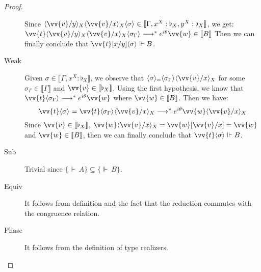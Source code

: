 \documentclass[runningheads,orivec,envcountsame,envcountsect]{llncs}
\newcommand\lra{\longrightarrow}
\newcommand\ansubst[2]{\ensuremath{\langle #1 \rangle_{#2}}}
\def\eval{\lra^*}
\def\sem#1{\llbracket#1\rrbracket}
\def\semr#1{\{{\real}~#1\}}
\def\real{\Vdash}
\newcommand\basis[1]{\ensuremath{\flat_{#1}}}
\begin{document}
\begin{proof}
\begin{description}
    Since $\ansubst{\vv{v}/y}{X}\ansubst{\vv{v}/x}{X}\ansubst{\sigma}{}\in\sem{\Gamma, x^X:\basis{X}, y^X:\basis{X}}$, we get: $\vv{t}\ansubst{\vv{v}/y}{X}\ansubst{\vv{v}/x}{X}\\\ansubst{\sigma_\Gamma}{}\eval e^{i\theta}\vv{w}\in\sem{B}$
    Then we can finally conclude that $\vv{t}[x/y]\ansubst{\sigma}{}\real B$.

    \item[Weak] Given $\sigma\in\sem{\Gamma,x^X:\basis{X}}$, we observe that $\ansubst{\sigma}=\ansubst{\sigma_\Gamma}{}\ansubst{\vv{v}/x}{X}$ for some $\sigma_\Gamma\in\sem{\Gamma}$ and $\vv{v}\in\sem{\basis{X}}$. Using the first hypothesis, we know that $\vv{t}\ansubst{\sigma_\Gamma}{}\eval e^{i\theta}\vv{w}$ where $\vv{w}\in\sem{B}$. Then we have:
    \[
    \vv{t}\ansubst{\sigma}{}=\vv{t}\ansubst{\sigma_\Gamma}{}\ansubst{\vv{v}/x}{X}\eval e^{i\theta}\vv{w}\ansubst{\vv{v}/x}{X}
    \]
    Since $\vv{v}\in\sem{\basis{X}}$, $\vv{w}\ansubst{\vv{v}/x}{X}=\vv{w}[\vv{v}/x]=\vv{w}$ and $\vv{w}\in\sem{B}$, then we can finally conclude that $\vv{t}\ansubst{\sigma}{}\real B$.
    
    \item[Sub] Trivial since $\semr{A}\subseteq\semr{B}$. 

    \item[Equiv] It follows from definition and the fact that the reduction commutes with the congruence relation.
    
    \item[Phase] It follows from the definition of type realizers.
    \end{description}
\end{proof}
\end{document}
